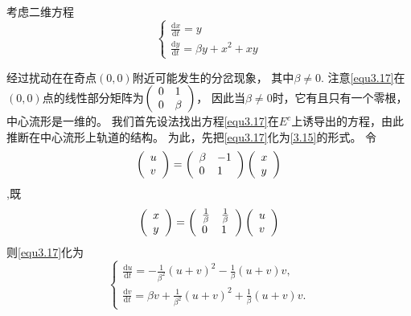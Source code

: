 \begin{example}
	考虑二维方程
	\begin{equation}
		\left\{
		\begin{array} { l }
			{ \frac { \mathrm { d } x } { \mathrm { d } t } = y } \\
			{ \frac { \mathrm { d } y } { \mathrm { d } t } = \beta y + x ^ { 2 } + x y }
		\end{array}
		\right.
		\label{eq1.3.17}
	\end{equation}
	
	经过扰动在在奇点\((0,0)\)附近可能发生的分岔现象，
	其中\(\beta \neq 0\).
	注意\ref{equ3.17}在\((0,0)\)点的线性部分矩阵为$\left(
		\begin{array} { l l }
				{ 0 } & { 1 }     \\
				{ 0 } & { \beta }
			\end{array}
		\right)$，
	因此当$\beta \neq 0$时，它有且只有一个零根，中心流形是一维的。
	我们首先设法找出方程\ref{equ3.17}在\(E^c\)上诱导出的方程，由此推断在中心流形上轨道的结构。
	为此，先把\ref{equ3.17}化为\ref{3.15}的形式。
	令
	\[
		\left(
		\begin{array}  { l }
				{ u } \\ { v }
			\end{array}
		\right)
		= \left(
		\begin{array} { l l }
				{ \beta } & { - 1 } \\
				{ 0 }     & { 1 }
			\end{array}
		\right)
		\left(
		\begin{array} { l }
				{ x } \\
				{ y }
			\end{array}
		\right)
	\]
	,既
	\[
		\left(
		\begin{array} { l }
				{ x } \\
				{ y }
			\end{array}
		\right)
		= \left(
		\begin{array} { l l }
				{ \frac { 1 } { \beta } } & { \frac { 1 } { \beta } } \\
				{ 0 }                     & { 1 }
			\end{array}
		\right)
		\left(
		\begin{array} { l }
				{ u } \\
				{ v }
			\end{array}
		\right)
	\]
	则\ref{equ3.17}化为
	\begin{equation}
		\left\{
		\begin{array} { l }
			{ \frac { \mathrm { d } u } { \mathrm { d } t } = - \frac { 1 } { \beta ^ { 2 } } ( u + v ) ^ { 2 } - \frac { 1 } { \beta } ( u + v ) v }, \\
			{ \frac { \mathrm { d } v } { \mathrm { d } t } = \beta v + \frac { 1 } { \beta ^ { 2 } } ( u + v ) ^ { 2 } + \frac { 1 } { \beta } ( u + v ) v }.
		\end{array}
		\right.
		\label{eq:1.3.18}
	\end{equation}
	

\end{example}
